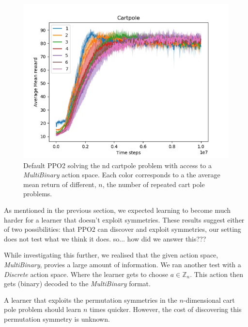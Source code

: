 \begin{figure}[h!]
  \centering
  \includegraphics[width=1\textwidth,height=0.5\textheight]{../../pictures/figures/multibinary-nd-cart.png}
  \caption{Default PPO2 solving the nd cartpole problem with access to a \textit{MultiBinary} action space. Each color corresponds to a the average mean return of different, $n$, the number of repeated cart pole problems.}
\end{figure}

As mentioned in the previous section, we expected learning to become much
harder for a learner that doesn't exploit symmetries. These results suggest either of two possibilities:
that PPO2 can discover and exploit symmetries, our setting does not test what we think it does. {\color{red}so... how did we answer this???}

While investigating this further, we realised that the given action space, \textit{MultiBinary}, provies a large amount of information. We ran another test with a \textit{Discrete} action space. Where the learner gets to choose $a\in \mathbb Z_n$.
This action then gets (binary) decoded to the \textit{MultiBinary} format.

A learner that exploits the permutation symmetries in the $n$-dimensional cart pole problem should learn $n$ times quicker.
However, the cost of discovering this permutation symmetry is unknown.

